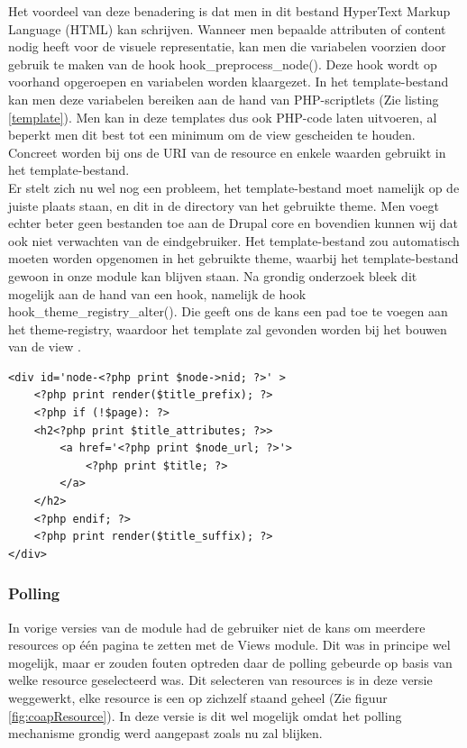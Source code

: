 Het voordeel van deze benadering is dat men in dit bestand HyperText Markup Language (HTML)  kan schrijven. Wanneer men bepaalde attributen of content nodig heeft voor de visuele representatie, kan men die variabelen voorzien door gebruik te maken van de hook hook\_preprocess\_node(). Deze hook wordt op voorhand opgeroepen en variabelen worden klaargezet. In het template-bestand kan men deze variabelen bereiken aan de hand van PHP-scriptlets (Zie listing \ref{template}). Men kan in deze templates dus ook PHP-code laten uitvoeren, al beperkt men dit best tot een minimum om de view gescheiden te houden. Concreet worden bij ons de URI van de resource en enkele waarden gebruikt in het template-bestand.\\

Er stelt zich nu wel nog een probleem, het template-bestand moet namelijk op de juiste plaats staan, en dit in de directory van het gebruikte theme. Men voegt echter beter geen bestanden toe aan de Drupal core en bovendien kunnen wij dat ook niet verwachten van de eindgebruiker. Het template-bestand zou automatisch moeten worden opgenomen in het gebruikte theme, waarbij het template-bestand gewoon in onze module kan blijven staan. Na grondig onderzoek bleek dit mogelijk aan de hand van een hook, namelijk de hook hook\_theme\_registry\_alter(). Die geeft ons de kans een pad toe te voegen aan het theme-registry, waardoor het template zal gevonden worden bij het bouwen van de view \cite{addTemplate}.

\lstset{language=HTML}

\begin{lstlisting}[label=template,caption=Voorbeeld van een template met PHP-scriptlets (node.tpl.php)]
<div id='node-<?php print $node->nid; ?>' >
	<?php print render($title_prefix); ?>
	<?php if (!$page): ?>
	<h2<?php print $title_attributes; ?>>
		<a href='<?php print $node_url; ?>'>
			<?php print $title; ?>
		</a>
	</h2>
	<?php endif; ?>
	<?php print render($title_suffix); ?>
</div>
\end{lstlisting}

\subsubsection{Polling}\label{polling}
In vorige versies van de module had de gebruiker niet de kans om meerdere resources op \'{e}\'{e}n pagina te zetten met de Views module. Dit was in principe wel mogelijk, maar er zouden fouten optreden daar de polling gebeurde op basis van welke resource geselecteerd was. Dit selecteren van resources is in deze versie weggewerkt, elke resource is een op zichzelf staand geheel (Zie figuur \ref{fig:coapResource}). In deze versie is dit wel mogelijk omdat het polling mechanisme grondig werd aangepast zoals nu zal blijken.\\

